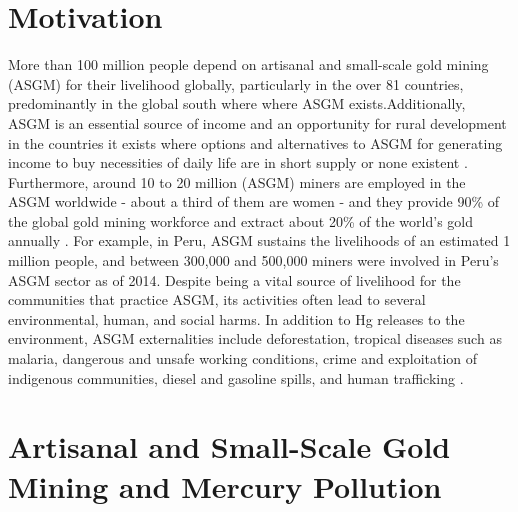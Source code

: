 \section{Motivation}
\begin{flushleft}
More than 100 million people depend on artisanal and small-scale gold mining (ASGM) for their livelihood globally, particularly in the over 81 countries, predominantly in the global south where where ASGM exists.Additionally, ASGM is an essential source of income and an opportunity for rural development in the countries it exists where options and alternatives to ASGM for generating income to buy necessities of daily life are in short supply or none existent \cite{planetgold_planetgold_2021}. Furthermore, around 10 to 20 million (ASGM) miners are employed in the ASGM worldwide - about a third of them are women - and they provide 90\% of the global gold mining workforce and extract about 20\% of the world’s gold annually \cite{planetgold_planetgold_2021}. For example, in Peru, ASGM sustains the livelihoods of an estimated 1 million people, and between 300,000 and 500,000 miners were involved in Peru’s ASGM sector as of 2014. Despite being a vital source of livelihood for the communities that practice ASGM, its activities often lead to several environmental, human, and social harms. In addition to Hg releases to the environment, ASGM externalities include deforestation, tropical diseases such as malaria, dangerous and unsafe working conditions, crime and exploitation of indigenous communities, diesel and gasoline spills, and human trafficking \cite{usaid_usaid_2020}. 
\end{flushleft}

\section{Artisanal and Small-Scale Gold Mining and Mercury Pollution}

